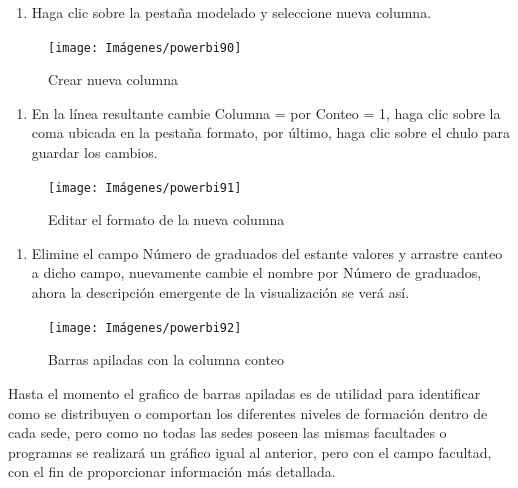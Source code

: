 \documentclass[
]{book}
\providecommand{\tightlist}{%
  \setlength{\itemsep}{0pt}\setlength{\parskip}{0pt}}
\begin{document}
\begin{enumerate}
\def\labelenumi{\arabic{enumi}.}
\tightlist
\item
  Haga clic sobre la pestaña modelado y seleccione nueva columna.
\end{enumerate}

\begin{figure}

{\centering \texttt{[image: Imágenes/powerbi90]} 

}

\caption{Crear nueva columna}\label{fig:paso1crearconteo-fig}
\end{figure}

\begin{enumerate}
\def\labelenumi{\arabic{enumi}.}
\setcounter{enumi}{1}
\tightlist
\item
  En la línea resultante cambie Columna = por Conteo = 1, haga clic sobre la coma ubicada en la pestaña formato, por último, haga clic sobre el chulo para guardar los cambios.
\end{enumerate}

\begin{figure}

{\centering \texttt{[image: Imágenes/powerbi91]} 

}

\caption{Editar el formato de la nueva columna}\label{fig:paso2crearconteo-fig}
\end{figure}

\begin{enumerate}
\def\labelenumi{\arabic{enumi}.}
\setcounter{enumi}{2}
\tightlist
\item
  Elimine el campo Número de graduados del estante valores y arrastre canteo a dicho campo, nuevamente cambie el nombre por Número de graduados, ahora la descripción emergente de la visualización se verá así.
\end{enumerate}

\begin{figure}

{\centering \texttt{[image: Imágenes/powerbi92]} 

}

\caption{Barras apiladas con la columna conteo}\label{fig:paso3crearconteo-fig}
\end{figure}

Hasta el momento el grafico de barras apiladas es de utilidad para identificar como se distribuyen o comportan los diferentes niveles de formación dentro de cada sede, pero como no todas las sedes poseen las mismas facultades o programas se realizará un gráfico igual al anterior, pero con el campo facultad, con el fin de proporcionar información más detallada.
\end{document}
